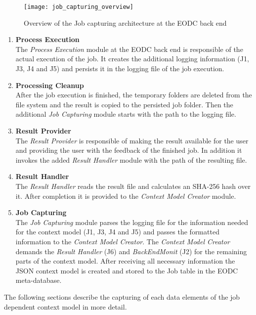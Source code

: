 \documentclass[draft,final]{vutinfth} %
\begin{document}
\begin{figure}[h]
	\centering
	\texttt{[image: job\_capturing\_overview]}
	\caption{Overview of the Job capturing architecture at the EODC back end}
	\label{fig:impljobcapture} %
\end{figure}

\begin{enumerate}
	\item \textbf{Process Execution} \\
	The \textit{Process Execution} module at the EODC back end is responsible of the actual execution of the job. It creates the additional logging information (J1, J3, J4 and J5) and persists it in the logging file of the job execution. 
	\item \textbf{Processing Cleanup} \\
	After the job execution is finished, the temporary folders are deleted from the file system and the result is copied to the persisted job folder. Then the additional \textit{Job Capturing} module starts with the path to the logging file.  
	\item \textbf{Result Provider} \\
	The \textit{Result Provider} is responsible of making the result available for the user and providing the user with the feedback of the finished job. In addition it invokes the added \textit{Result Handler} module with the path of the resulting file.
	\item \textbf{Result Handler} \\
	The \textit{Result Handler} reads the result file and calculates an SHA-256 hash over it. After completion it is provided to the \textit{Context Model Creator} module.  
	\item \textbf{Job Capturing} \\
	The \textit{Job Capturing} module parses the logging file for the information needed for the context model (J1, J3, J4 and J5) and passes the formatted information to the \textit{Context Model Creator}. The \textit{Context Model Creator} demands the \textit{Result Handler} (J6) and \textit{BackEndMonit} (J2) for the remaining parts of the context model. After receiving all necessary information the JSON context model is created and stored to the Job table in the EODC meta-database.    
\end{enumerate}

The following sections describe the capturing of each data elements of the job dependent context model in more detail.
\end{document}
